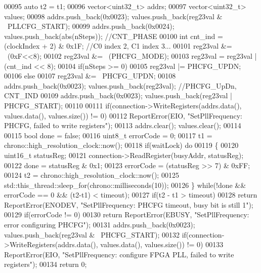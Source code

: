 \begin{DoxyCode}
00095     \textcolor{keyword}{auto} t2 = t1;
00096     vector<uint32\_t> addrs;
00097     vector<uint32\_t> values;
00098     addrs.push\_back(0x0023); values.push\_back(reg23val & ~PLLCFG\_START);
00099     addrs.push\_back(0x0024); values.push\_back(abs(nSteps)); \textcolor{comment}{//CNT\_PHASE}
00100     \textcolor{keywordtype}{int} cnt\_ind = (clockIndex + 2) & 0x1F; \textcolor{comment}{//C0 index 2, C1 index 3...}
00101     reg23val &= ~(0xF<<8);
00102     reg23val &= ~(PHCFG_MODE);
00103     reg23val = reg23val | (cnt\_ind << 8);
00104     \textcolor{keywordflow}{if}(nSteps >= 0)
00105         reg23val |= PHCFG_UPDN;
00106     \textcolor{keywordflow}{else}
00107         reg23val &= ~PHCFG\_UPDN;
00108     addrs.push\_back(0x0023); values.push\_back(reg23val); \textcolor{comment}{//PHCFG\_UpDn, CNT\_IND}
00109     addrs.push\_back(0x0023); values.push\_back(reg23val | PHCFG\_START);
00110 
00111     \textcolor{keywordflow}{if}(connection->WriteRegisters(addrs.data(), values.data(), values.size()) != 0)
00112         ReportError(EIO, \textcolor{stringliteral}{"SetPllFrequency: PHCFG, failed to write registers"});
00113     addrs.clear(); values.clear();
00114 
00115     \textcolor{keywordtype}{bool} done = \textcolor{keyword}{false};
00116     uint8\_t errorCode = 0;
00117     t1 = chrono::high\_resolution\_clock::now();
00118     \textcolor{keywordflow}{if}(waitLock) \textcolor{keywordflow}{do}
00119     \{
00120         uint16\_t statusReg;
00121         connection->ReadRegister(busyAddr, statusReg);
00122         done = statusReg & 0x1;
00123         errorCode = (statusReg >> 7) & 0xFF;
00124         t2 = chrono::high\_resolution\_clock::now();
00125         std::this\_thread::sleep\_for(chrono::milliseconds(10));
00126     \} \textcolor{keywordflow}{while}(!done && errorCode == 0 && (t2-t1) < timeout);
00127     \textcolor{keywordflow}{if}(t2 - t1 > timeout)
00128         \textcolor{keywordflow}{return} ReportError(ENODEV, \textcolor{stringliteral}{"SetPllFrequency: PHCFG timeout, busy bit is still 1"});
00129     \textcolor{keywordflow}{if}(errorCode != 0)
00130         \textcolor{keywordflow}{return} ReportError(EBUSY, \textcolor{stringliteral}{"SetPllFrequency: error configuring PHCFG"});
00131     addrs.push\_back(0x0023); values.push\_back(reg23val & ~PHCFG\_START);
00132     \textcolor{keywordflow}{if}(connection->WriteRegisters(addrs.data(), values.data(), values.size()) != 0)
00133         ReportError(EIO, \textcolor{stringliteral}{"SetPllFrequency: configure FPGA PLL, failed to write registers"});
00134     \textcolor{keywordflow}{return} 0;

\end{DoxyCode}
